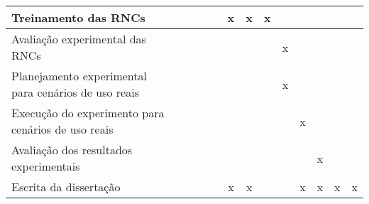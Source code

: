 \begin{table}[]
\begin{tabular}{|A|c|c|c|c|c|c|c|c|c|c|c|c|}
Treinamento das RNCs                                 &              &              &              &              & x            & x            & x            &              &              &              &              &              \\ \hline
Avaliação experimental das RNCs                      &              &              &              &              &              &              &              & x            &              &              &              &              \\ \hline
Planejamento experimental para cenários de uso reais &              &              &              &              &              &              &              & x            &              &              &              &              \\ \hline
Execução do experimento para cenários de uso reais   &              &              &              &              &              &              &              &              & x            &              &              &              \\ \hline
Avaliação dos resultados experimentais               &              &              &              &              &              &              &              &              &              & x            &              &              \\ \hline
Escrita da dissertação                               &              &              &              &              & x            & x            &              &              & x            & x            & x            & x            \\ \hline
\end{tabular}
\end{table}
